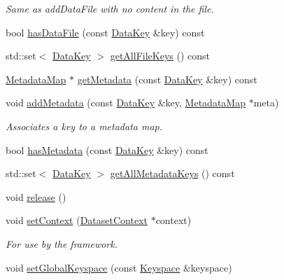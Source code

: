 \begin{DoxyCompactItemize}
\begin{DoxyCompactList}\small\item\em Same as addDataFile with no content in the file. \item\end{DoxyCompactList}\item 
bool \hyperlink{classBUSBOY_1_1Dataset_a64cd95914f1c015beb705360e2dcd8ea}{hasDataFile} (const \hyperlink{classBUSBOY_1_1DataKey}{DataKey} \&key) const 
\item 
std::set$<$ \hyperlink{classBUSBOY_1_1DataKey}{DataKey} $>$ \hyperlink{classBUSBOY_1_1Dataset_a7d8ab5643693203998c8f7dafe66a7b1}{getAllFileKeys} () const 
\item 
\hyperlink{classBUSBOY_1_1MetadataMap}{MetadataMap} $\ast$ \hyperlink{classBUSBOY_1_1Dataset_a5f3077140eb5028fbfe0c4a606b31e5e}{getMetadata} (const \hyperlink{classBUSBOY_1_1DataKey}{DataKey} \&key) const 
\item 
void \hyperlink{classBUSBOY_1_1Dataset_a793a73fb6cb9090b76d8a9da487a2841}{addMetadata} (const \hyperlink{classBUSBOY_1_1DataKey}{DataKey} \&key, \hyperlink{classBUSBOY_1_1MetadataMap}{MetadataMap} $\ast$meta)
\begin{DoxyCompactList}\small\item\em Associates a key to a metadata map. \item\end{DoxyCompactList}\item 
bool \hyperlink{classBUSBOY_1_1Dataset_a06a24c865a3d0cb9e347436a054e42ae}{hasMetadata} (const \hyperlink{classBUSBOY_1_1DataKey}{DataKey} \&key) const 
\item 
std::set$<$ \hyperlink{classBUSBOY_1_1DataKey}{DataKey} $>$ \hyperlink{classBUSBOY_1_1Dataset_adc5ff7f63813f89976a67944697dc580}{getAllMetadataKeys} () const 
\item 
void \hyperlink{classBUSBOY_1_1Dataset_a51764b4447cad2364b5ea16415e08b67}{release} ()
\item 
void \hyperlink{classBUSBOY_1_1Dataset_aa9b353a7b61f332bad63adc36bf5a9cb}{setContext} (\hyperlink{classBUSBOY_1_1DatasetContext}{DatasetContext} $\ast$context)
\begin{DoxyCompactList}\small\item\em For use by the framework. \item\end{DoxyCompactList}\item 
void \hyperlink{classBUSBOY_1_1Dataset_a48d6e5a8ea34c64459a3165903021497}{setGlobalKeyspace} (const \hyperlink{classBUSBOY_1_1Keyspace}{Keyspace} \&keyspace)

\end{DoxyCompactItemize}
